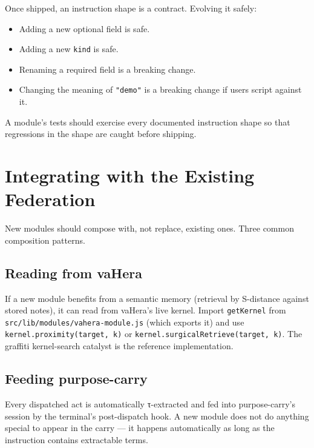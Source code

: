\documentclass[11pt,a4paper]{article}
\theoremstyle{contract}
\begin{document}
Once shipped, an instruction shape is a contract. Evolving it safely:

\begin{itemize}[nosep,leftmargin=1.4em]
\item Adding a new optional field is safe.
\item Adding a new \texttt{kind} is safe.
\item Renaming a required field is a breaking change.
\item Changing the meaning of \texttt{"demo"} is a breaking change if
users script against it.
\end{itemize}

A module's tests should exercise every documented instruction shape so
that regressions in the shape are caught before shipping.

\section{Integrating with the Existing Federation}
\label{sec:integration}

New modules should compose with, not replace, existing ones. Three
common composition patterns.

\subsection{Reading from vaHera}

If a new module benefits from a semantic memory (retrieval by S-distance
against stored notes), it can read from vaHera's live kernel. Import
\texttt{getKernel} from \texttt{src/lib/modules/vahera-module.js} (which
exports it) and use \texttt{kernel.proximity(target, k)} or
\texttt{kernel.surgicalRetrieve(target, k)}. The graffiti kernel-search
catalyst is the reference implementation.

\subsection{Feeding purpose-carry}

Every dispatched act is automatically τ-extracted and fed into
purpose-carry's session by the terminal's post-dispatch hook. A new
module does not do anything special to appear in the carry --- it
happens automatically as long as the instruction contains extractable
terms.
\end{document}
